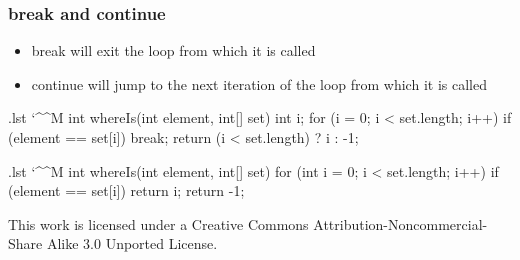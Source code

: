 \documentclass[10pt]{beamer}
\makeatletter
\newenvironment{code}{%
  \begingroup
  \@bsphack
  \immediate\openout\lstvrb@out\jobname.lst
  \let\do\@makeother\dospecials\catcode`\^^M\active
  \def\verbatim@processline{%
    \immediate\write\lstvrb@out{\the\verbatim@line}}%
  \verbatim@start}{%
  \immediate\closeout\lstvrb@out
  \@esphack
  \endgroup

  \begin{alertblock}{}
    
  \end{alertblock}}
\makeatother
\begin{document}
\begin{frame}[fragile]
\frametitle{break and continue}
\begin{itemize}
   \item break will exit the loop from which it is called
   \item continue will jump to the next iteration of the loop from which it is called
\end{itemize}

\begin{code}
int whereIs(int element, int[] set) {
  int i;
  for (i = 0; i < set.length; i++) {
    if (element == set[i]) {
      break;
    }
  }
  return (i < set.length) ? i : -1;
}
\end{code}
\end{frame}

\begin{frame}[fragile]
\begin{code}
int whereIs(int element, int[] set) {
  for (int i = 0; i < set.length; i++) {
    if (element == set[i]) {
      return i;
    }
  }
  return -1;
}
\end{code}

\end{frame}

\begin{frame}
\begin{center}
  \tiny
  This work is licensed under a Creative Commons Attribution-Noncommercial-Share Alike 3.0 Unported License.
\end{center}
\end{frame}
\end{document}
